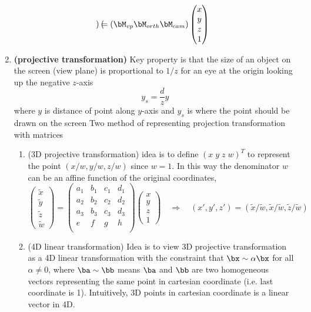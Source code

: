 \documentclass[11pt]{article}
\newcommand{\heading}[1]{(#1)}
\newcommand{\bheading}[1]{\textbf{(#1)}}
\begin{document}
\begin{enumerate}
\[\begin{pmatrix}
        \end{pmatrix}
        = 
        (\bM_{vp} \bM_{orth} \bM_{cam})
        \begin{pmatrix}
            x \\ y \\ z \\ 1
        \end{pmatrix}
    \]
    \item \bheading{projective transformation} Key property is that the size of an object on the screen (view plane) is proportional to $1/z$ for an eye at the origin looking up the negative $z$-axis
    \[
        y_s = \frac{d}{z} y    
    \]
    where $y$ is distance of point along $y$-axis and $y_s$ is where the point should be drawn on the screen
    Two method of representing projection transformation with matrices
    \begin{enumerate}
        \item \heading{3D projective transformation} idea is to define $(x\;y\;z\;w)^T$ to represent the point $(x/w,y/w,z/w)$ since $w=1$. In this way the denominator $w$ can be an affine function of the original coordinates, 
        \[
            \begin{pmatrix}
                \tilde{x} \\ \tilde{y} \\ \tilde{z} \\  \tilde{w}
            \end{pmatrix}    
            = 
            \begin{pmatrix}
                a_1 & b_1 & c_1 & d_1 \\ 
                a_2 & b_2 & c_2 & d_2 \\ 
                a_3 & b_3 & c_3 & d_3 \\ 
                e & f & g & h \\
            \end{pmatrix}
            \begin{pmatrix}
                x \\ y \\ z \\ 1
            \end{pmatrix}
            \quad \Rightarrow \quad
            (x',y',z') = (\tilde{x}/\tilde{w}, \tilde{x}/\tilde{w}, \tilde{z}/\tilde{w})
        \]
        \item \heading{4D linear transformation} Idea is to view 3D projective transformation as a 4D linear transformation with the constraint that $\bx \sim \alpha \bx$ for all $\alpha\neq 0$, where $\ba\sim\bb$ means $\ba$ and $\bb$ are two homogeneous vectors representing the same point in cartesian coordinate (i.e. last coordinate is 1). Intuitively, 3D points in cartesian coordinate is a linear vector in 4D.

\end{enumerate}
\end{enumerate}
\end{document}

